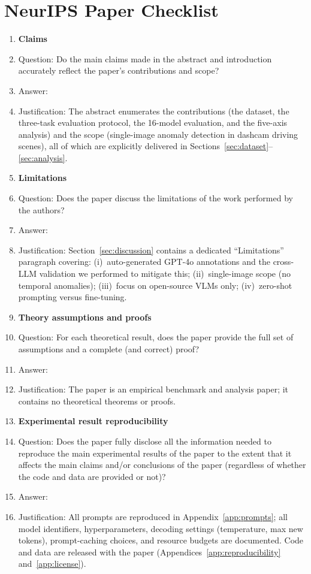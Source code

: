 \section*{NeurIPS Paper Checklist}

\begin{enumerate}

\item {\bf Claims}
    \item[] Question: Do the main claims made in the abstract and introduction accurately reflect the paper's contributions and scope?
    \item[] Answer: \answerYes{}
    \item[] Justification: The abstract enumerates the contributions
          (the \bench dataset, the three-task evaluation protocol,
          the 16-model evaluation, and the five-axis analysis) and
          the scope (single-image anomaly detection in dashcam
          driving scenes), all of which are explicitly delivered in
          Sections~\ref{sec:dataset}--\ref{sec:analysis}.

\item {\bf Limitations}
    \item[] Question: Does the paper discuss the limitations of the work performed by the authors?
    \item[] Answer: \answerYes{}
    \item[] Justification: Section~\ref{sec:discussion} contains a
          dedicated ``Limitations'' paragraph covering: (i)~auto-generated
          GPT-4o annotations and the cross-LLM validation we performed
          to mitigate this; (ii)~single-image scope (no temporal
          anomalies); (iii)~focus on open-source VLMs only;
          (iv)~zero-shot prompting versus fine-tuning.

\item {\bf Theory assumptions and proofs}
    \item[] Question: For each theoretical result, does the paper provide the full set of assumptions and a complete (and correct) proof?
    \item[] Answer: \answerNA{}
    \item[] Justification: The paper is an empirical
          benchmark and analysis paper; it contains no theoretical
          theorems or proofs.

    \item {\bf Experimental result reproducibility}
    \item[] Question: Does the paper fully disclose all the information needed to reproduce the main experimental results of the paper to the extent that it affects the main claims and/or conclusions of the paper (regardless of whether the code and data are provided or not)?
    \item[] Answer: \answerYes{}
    \item[] Justification: All prompts are reproduced in
          Appendix~\ref{app:prompts}; all model identifiers, hyperparameters,
          decoding settings (temperature, max new tokens), prompt-caching
          choices, and resource budgets are documented. Code and data are
          released with the paper (Appendices~\ref{app:reproducibility}
          and~\ref{app:license}).


\end{enumerate}
